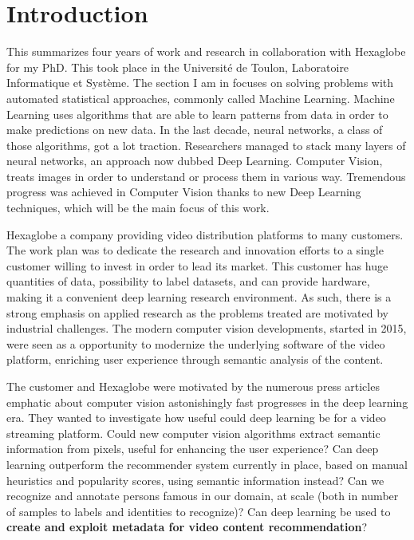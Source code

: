\chapter{Introduction}


This summarizes four years of work and research in collaboration with Hexaglobe for my PhD. This took place in the Université de Toulon, Laboratoire Informatique et Système. The section I am in focuses on solving problems with automated statistical approaches, commonly called Machine Learning. Machine Learning uses algorithms that are able to learn patterns from data in order to make predictions on new data. In the last decade, neural networks, a class of those algorithms, got a lot traction. Researchers managed to stack many layers of neural networks, an approach now dubbed Deep Learning. Computer Vision, treats images in order to understand or process them in various way. Tremendous progress was achieved in Computer Vision thanks to new Deep Learning techniques, which will be the main focus of this work.

Hexaglobe a company providing video distribution platforms to many customers. The work plan was to dedicate the research and innovation efforts to a single customer willing to invest in order to lead its market. This customer has huge quantities of data, possibility to label datasets, and can provide hardware, making it a convenient deep learning research environment. As such, there is a strong emphasis on applied research as the problems treated are motivated by industrial challenges. The modern computer vision developments, started in 2015, were seen as a opportunity to modernize the underlying software of the video platform, enriching user experience through semantic analysis of the content.

The customer and Hexaglobe were motivated by the numerous press articles emphatic about computer vision astonishingly fast progresses in the deep learning era. They wanted to investigate how useful could deep learning be for a video streaming platform. Could new computer vision algorithms extract semantic information from pixels, useful for enhancing the user experience? Can deep learning outperform the recommender system currently in place, based on manual heuristics and popularity scores, using semantic information instead? Can we recognize and annotate persons famous in our domain, at scale (both in number of samples to labels and identities to recognize)? Can deep learning be used to \textbf{create and exploit metadata for video content recommendation}?

